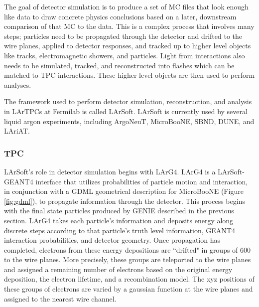 \par The goal of detector simulation is to produce a set of MC files that look enough like data to draw concrete physics conclusions based on a later, downstream comparison of that MC to the data. This is a complex process that involves many steps; particles need to be propagated through the detector and drifted to the wire planes, applied to detector responses, and tracked up to higher level objects like tracks, electromagnetic showers, and particles. Light from interactions also needs to be simulated, tracked, and reconstructed into flashes which can be matched to TPC interactions. These higher level objects are then used to perform analyses. 
\par The framework used to perform detector simulation, reconstruction, and analysis in LArTPCs at Fermilab is called LArSoft. LArSoft is currently used by several liquid argon experiments, including ArgoNeuT, MicroBooNE, SBND, DUNE, and LAriAT. 
\subsubsection{TPC}
\par LArSoft's role in detector simulation begins with LArG4. LArG4 is a LArSoft-GEANT4 interface that utilizes probabilities of particle motion and interaction, in conjunction with a GDML geometrical description for MicroBooNE (Figure \ref{fig:gdml}), to propagate information through the detector.  This process begins with the final state particles produced by GENIE described in the previous section. LArG4 takes each particle's information and deposits energy along discrete steps according to that particle's truth level information, GEANT4 interaction probabilities, and detector geometry. Once propagation has completed, electrons from these energy depositions are ``drifted" in groups of 600 to the wire planes. More precisely, these groups are teleported to the wire planes and assigned a remaining number of electrons based on the original energy deposition, the electron lifetime, and a recombination model. The xyz positions of these groups of electrons are varied by a gaussian function at the wire planes and assigned to the nearest wire channel. 

